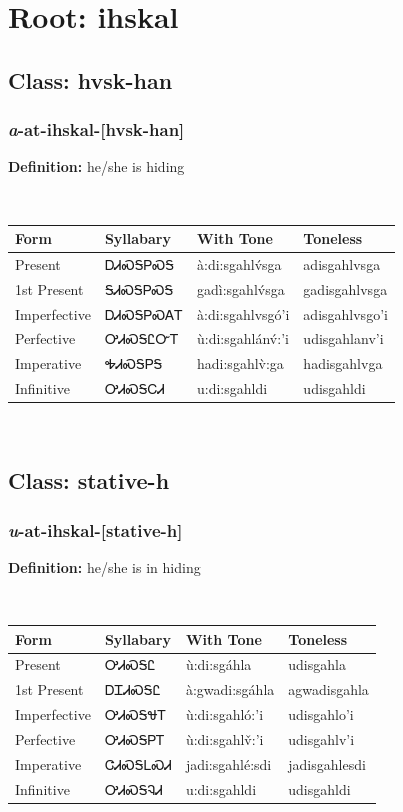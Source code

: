 \needspace{4in}
\section*{Root: ihskal}
\nopagebreak
{}
\needspace{3in}
\subsection*{Class: hvsk-han}
\nopagebreak
\needspace{2in}
\subsubsection*{\textit{a}{-}at{-}\textbf{ihskal}{-}[hvsk-han]}
\nopagebreak
\textbf{Definition: } he/she is hiding
\\[0.5em]
\begin{tabularx}{\textwidth}{l X X X}%
\toprule%
\textbf{Form}&\textbf{Syllabary}&\textbf{With Tone}&\textbf{Toneless}\\%
\midrule%
Present&ᎠᏗᏍᎦᏢᏍᎦ&à:di:sgahlv́sga&adisgahlvsga\\%
1st Present&ᎦᏗᏍᎦᏢᏍᎦ&gadì:sgahlv́sga&gadisgahlvsga\\%
Imperfective&ᎠᏗᏍᎦᏢᏍᎪᎢ&à:di:sgahlvsgó’i&adisgahlvsgo’i\\%
Perfective&ᎤᏗᏍᎦᏝᏅᎢ&ù:di:sgahlánv́:’i&udisgahlanv’i\\%
Imperative&ᎭᏗᏍᎦᏢᎦ&hadi:sgahlv̀:ga&hadisgahlvga\\%
Infinitive&ᎤᏗᏍᎦᏟᏗ&u:di:sgahldi&udisgahldi\\%
\bottomrule%
\end{tabularx}
\\[1em]
\needspace{3in}
\subsection*{Class: stative-h}
\nopagebreak
\needspace{2in}
\subsubsection*{\textit{u}{-}at{-}\textbf{ihskal}{-}[stative-h]}
\nopagebreak
\textbf{Definition: } he/she is in hiding
\\[0.5em]
\begin{tabularx}{\textwidth}{l X X X}%
\toprule%
\textbf{Form}&\textbf{Syllabary}&\textbf{With Tone}&\textbf{Toneless}\\%
\midrule%
Present&ᎤᏗᏍᎦᏝ&ù:di:sgáhla&udisgahla\\%
1st Present&ᎠᏆᏗᏍᎦᏝ&à:gwadi:sgáhla&agwadisgahla\\%
Imperfective&ᎤᏗᏍᎦᏠᎢ&ù:di:sgahló:’i&udisgahlo’i\\%
Perfective&ᎤᏗᏍᎦᏢᎢ&ù:di:sgahlv̌:’i&udisgahlv’i\\%
Imperative&ᏣᏗᏍᎦᏞᏍᏗ&jadi:sgahlé:sdi&jadisgahlesdi\\%
Infinitive&ᎤᏗᏍᎦᎸᏗ&u:di:sgahldi&udisgahldi\\%
\bottomrule%
\end{tabularx}
\\[1em]